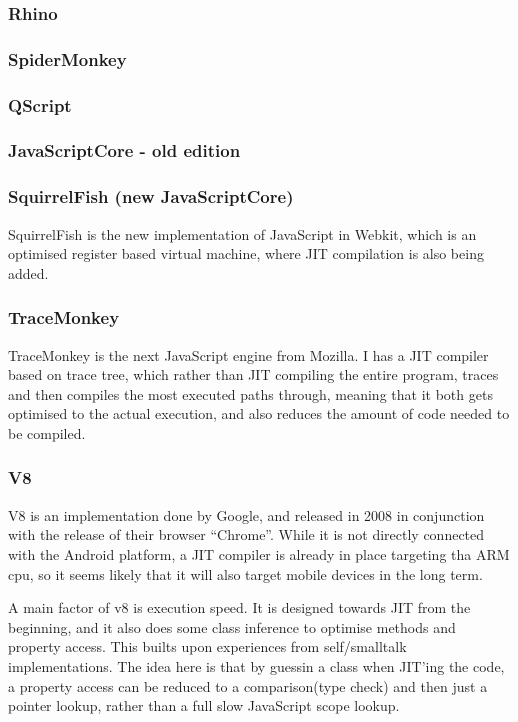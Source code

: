 \subsubsection{Rhino}
\subsubsection{SpiderMonkey}
\label{spidermonkey}
\subsubsection{QScript}
\subsubsection{JavaScriptCore - old edition}
\subsubsection{SquirrelFish (new JavaScriptCore)}
SquirrelFish is the new implementation of JavaScript in Webkit,
which is an optimised register based virtual machine,
where JIT compilation is also being added.

\subsubsection{TraceMonkey}
TraceMonkey is the next JavaScript engine from Mozilla.
I has a JIT compiler based on trace tree, 
which rather than JIT compiling the entire program,
traces and then compiles the most executed paths through,
meaning that it both gets optimised to the actual execution,
and also reduces the amount of code needed to be compiled.


\subsubsection{V8}
V8 is an implementation done by Google, and released in 2008 in conjunction with the release of their browser ``Chrome''. 
While it is not directly connected with the Android platform, a JIT compiler is already in place targeting tha ARM cpu, so it seems likely that it will also target mobile devices in the long term.

A main factor of v8 is execution speed. It is designed towards JIT from the beginning, and it also does some class inference to optimise methods and property access.
This builts upon experiences from self/smalltalk implementations\cite{articles-before-v8}.
The idea here is that by guessin a class when JIT'ing the code, a property access can be reduced to a comparison(type check) and then just a pointer lookup, rather than a full slow JavaScript scope lookup.


